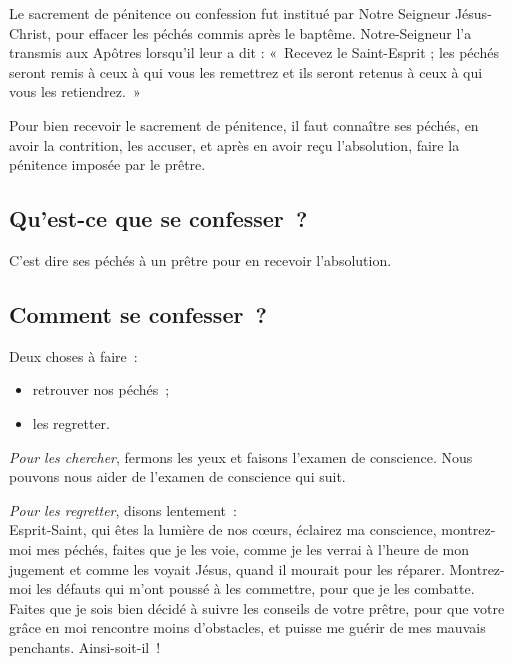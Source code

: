 \documentclass[%
a5paper%
,11pt%
,DIV=15%
,titlepage=on%
,headings=optiontoheadandtoc%
,headings=small%
,parskip=false%
,openany%
]{scrbook}
\let\oldaddchap\addchap
\def\addchap#1{\oldaddchap{#1}\markright{Pèlerinage du Christ-Roi}}
\begin{document}

%




Le sacrement de pénitence ou confession fut institué par Notre Seigneur Jésus-Christ, pour effacer les péchés commis après le baptême. Notre-Seigneur l’a transmis aux Apôtres lorsqu’il leur a dit : « Recevez le Saint-Esprit ; les péchés seront remis à ceux à qui vous les remettrez et ils seront retenus à ceux à qui vous les retiendrez. »



Pour bien recevoir le sacrement de pénitence, il faut connaître ses péchés, en avoir la contrition, les accuser, et après en avoir reçu l’absolution, faire la pénitence imposée par le prêtre.

\subsection*{Qu’est-ce que se confesser ?}

C’est dire ses péchés à un prêtre pour en recevoir l’absolution.

\subsection*{Comment se confesser ?}

Deux choses à faire :
\begin{itemize}
\item retrouver nos péchés ;
\item les regretter.
\end{itemize}

\emph{Pour les chercher}, fermons les yeux et faisons l’examen de conscience. Nous pouvons nous aider de l’examen de conscience qui suit.
\pagebreak[3]

\emph{Pour les regretter}, disons lentement :\\
Esprit-Saint, qui êtes la lumière de nos cœurs, éclairez ma conscience, montrez-moi mes péchés, faites que je les voie, comme je les verrai à l’heure de mon jugement et comme les voyait Jésus, quand il mourait pour les réparer. Montrez-moi les défauts qui m’ont poussé à les commettre, pour que je les combatte. Faites que je sois bien décidé à suivre les conseils de votre prêtre, pour que votre grâce en moi rencontre moins d’obstacles, et puisse me guérir de mes mauvais penchants. Ainsi-soit-il !
\end{document}
